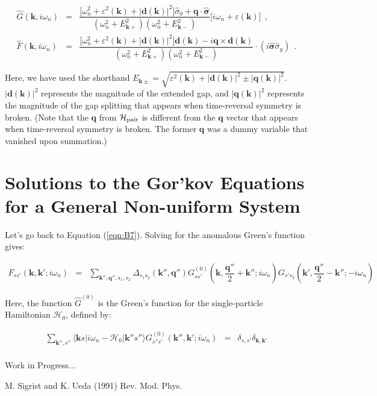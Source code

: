 \documentclass[uplatex,a4j,12pt,dvipdfmx]{jsarticle}
\begin{document}
\begin{eqnarray}
	\hat{G}(\bm{k},i \omega_{n})
	&=&
	\dfrac{ \Big[ \omega_{n}^{2} + \varepsilon^{2}(\bm{k}) + | \bm{d}(\bm{k}) |^{2} \Big] \hat{\sigma}_{0} + \bm{q} \cdot \hat{\bm{\sigma}} }
	{ ( \omega_{n}^{2} + E_{\bm{k}+}^{2} ) ( \omega_{n}^{2} + E_{\bm{k}-}^{2} ) }
	\Big[ i \omega_{n} + \varepsilon(\bm{k}) \Big]
	\ \ ,
	\nonumber \\[2mm]
	\hat{F}(\bm{k},i \omega_{n})
	&=&
	\dfrac{ \Big[ \omega_{n}^{2} + \varepsilon^{2}(\bm{k}) + | \bm{d}(\bm{k}) |^{2} \Big] \bm{d}(\bm{k}) - i \bm{q} \times \bm{d}(\bm{k}) }
	{ ( \omega_{n}^{2} + E_{\bm{k}+}^{2} ) ( \omega_{n}^{2} + E_{\bm{k}-}^{2} ) }
	\cdot
	(i \hat{\bm{\sigma}} \hat{\sigma}_{y})
	\ \ .
\end{eqnarray}

Here, we have used the shorthand $E_{\bm{k} \pm} = \sqrt{ \varepsilon^{2}(\bm{k}) + | \bm{d}(\bm{k}) |^{2} \pm | \bm{q}(\bm{k}) |^{2} }$. $|\bm{d}(\bm{k})|^{2}$ represents the magnitude of the extended gap, and $|\bm{q}(\bm{k})|^{2}$ represents the magnitude of the gap splitting that appears when time-reversal symmetry is broken. (Note that the $\bm{q}$ from $\mathcal{H}_{\rm pair}$ is different from the $\bm{q}$ vector that appears when time-reversal symmetry is broken. The former $\bm{q}$ was a dummy variable that vanished upon summation.)

\section{Solutions to the Gor'kov Equations for a General Non-uniform System}

Let's go back to Equation (\ref{eqn:B7}). Solving for the anomalous Green's function gives:

\begin{eqnarray}
	F_{ss'} ( \bm{k} , \bm{k}' ; i \omega_{n} )
	&=&
	\sum_{\bm{k}'' , \bm{q}'' , s_{1} , s_{2}}
	\Delta_{s_{1} s_{2}}( \bm{k}'' , \bm{q}'' )
	G_{ss'}^{(0)} ( \bm{k} , \dfrac{\bm{q}''}{2} + \bm{k}'' ; i \omega_{n} )
	G_{s' s_{2}} ( \bm{k}' , \dfrac{\bm{q}''}{2} - \bm{k}'' ; - i \omega_{n} )
\end{eqnarray}

Here, the function $\hat{G}^{(0)}$ is the Green's function for the single-particle Hamiltonian $\mathcal{H}_{0}$, defined by:

\begin{eqnarray}
	\sum_{\bm{k}'' , s''}
	\langle \bm{k} s |  i \omega_{n} - \mathcal{H}_{0} | \bm{k}'' s'' \rangle
	G_{s''s'}^{(0)} ( \bm{k}'' , \bm{k}' ; i \omega_{n} )
	&=&
	\delta_{s,s'}
	\delta_{\bm{k},\bm{k}'}
\end{eqnarray}
\ \\

Work in Progress...

\begin{thebibliography}{9}
	 M. Sigrist and K. Ueda (1991) Rev. Mod. Phys.

\end{thebibliography}
\end{document}
